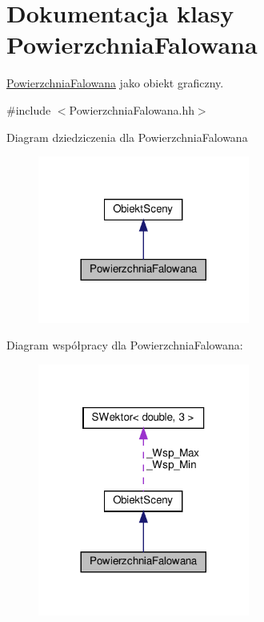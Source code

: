 \hypertarget{classPowierzchniaFalowana}{}\section{Dokumentacja klasy Powierzchnia\+Falowana}
\label{classPowierzchniaFalowana}


\hyperlink{classPowierzchniaFalowana}{Powierzchnia\+Falowana} jako obiekt graficzny.  




{\ttfamily \#include $<$Powierzchnia\+Falowana.\+hh$>$}



Diagram dziedziczenia dla Powierzchnia\+Falowana
\nopagebreak
\begin{figure}[H]
\begin{center}
\leavevmode
\includegraphics[width=197pt]{classPowierzchniaFalowana__inherit__graph}
\end{center}
\end{figure}


Diagram współpracy dla Powierzchnia\+Falowana\+:
\nopagebreak
\begin{figure}[H]
\begin{center}
\leavevmode
\includegraphics[width=197pt]{classPowierzchniaFalowana__coll__graph}
\end{center}
\end{figure}

